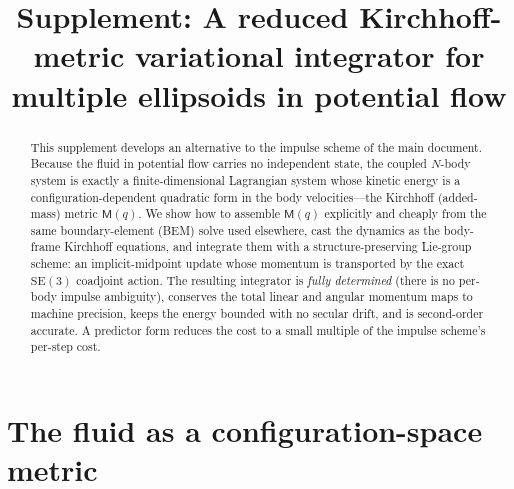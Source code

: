 \documentclass[11pt]{article}
\title{Supplement: A reduced Kirchhoff-metric variational integrator
for multiple ellipsoids in potential flow}
\date{}
\newcommand{\SEthree}{\mathrm{SE}(3)}
\newcommand{\Mmat}{\mathsf{M}}
\begin{document}
\maketitle

\begin{abstract}
This supplement develops an alternative to the impulse scheme of the main
document. Because the fluid in potential flow carries no independent state, the
coupled $N$-body system is exactly a finite-dimensional Lagrangian system whose
kinetic energy is a configuration-dependent quadratic form in the body
velocities---the Kirchhoff (added-mass) metric $\Mmat(q)$. We show how to
assemble $\Mmat(q)$ explicitly and cheaply from the same boundary-element (BEM)
solve used elsewhere, cast the dynamics as the body-frame Kirchhoff equations,
and integrate them with a structure-preserving Lie-group scheme: an
implicit-midpoint update whose momentum is transported by the exact $\SEthree$
coadjoint action. The resulting integrator is \emph{fully determined} (there is
no per-body impulse ambiguity), conserves the total linear and angular momentum
maps to machine precision, keeps the energy bounded with no secular drift, and
is second-order accurate. A predictor form reduces the cost to a small multiple
of the impulse scheme's per-step cost.
\end{abstract}

\section{The fluid as a configuration-space metric}
\label{sec:rm-metric}
\end{document}
